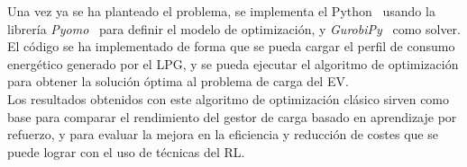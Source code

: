 Una vez ya se ha planteado el problema, se implementa el Python~\cite{python2024language}
usando la librería \textit{Pyomo}~\cite{pyomo2024} para definir el modelo de optimización, y
\textit{GurobiPy}~\cite{gurobi2024} como solver. El código se ha implementado de forma que se pueda
cargar el perfil de consumo energético generado por el LPG, y se pueda ejecutar el algoritmo de
optimización para obtener la solución óptima al problema de carga del EV.\\

Los resultados obtenidos con este algoritmo de optimización clásico sirven como base para
comparar el rendimiento del gestor de carga basado en aprendizaje por refuerzo, y para evaluar la
mejora en la eficiencia y reducción de costes que se puede lograr con el uso de técnicas del RL.\\ 

